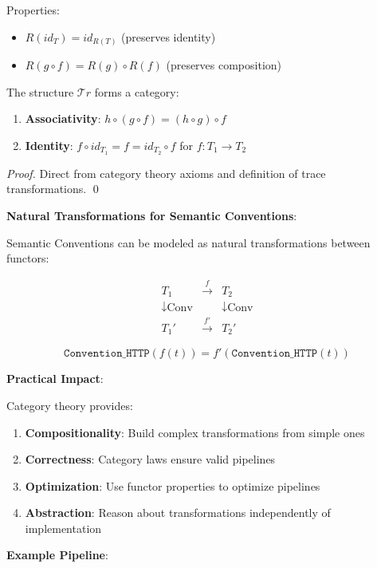 Properties:
\begin{itemize}
\item $R(id_T) = id_{R(T)}$ (preserves identity)
\item $R(g \circ f) = R(g) \circ R(f)$ (preserves composition)
\end{itemize}

\begin{theorem}
\label{thm:category}
The structure $\mathcal{T}r$ forms a category:
\begin{enumerate}
\item \textbf{Associativity}: $h \circ (g \circ f) = (h \circ g) \circ f$
\item \textbf{Identity}: $f \circ id_{T_1} = f = id_{T_2} \circ f$ for $f: T_1 \rightarrow T_2$
\end{enumerate}
\end{theorem}

\begin{proof}
Direct from category theory axioms and definition of trace transformations. \qed
\end{proof}

\textbf{Natural Transformations for Semantic Conventions}:

Semantic Conventions can be modeled as natural transformations between functors:

\[
\begin{array}{ccc}
T_1 & \xrightarrow{f} & T_2 \\
\downarrow \text{Conv} && \downarrow \text{Conv} \\
T_1' & \xrightarrow{f'} & T_2'
\end{array}
\]

\[
\texttt{Convention\_HTTP}(f(t)) = f'(\texttt{Convention\_HTTP}(t))
\]

\textbf{Practical Impact}:

Category theory provides:
\begin{enumerate}
\item \textbf{Compositionality}: Build complex transformations from simple ones
\item \textbf{Correctness}: Category laws ensure valid pipelines
\item \textbf{Optimization}: Use functor properties to optimize pipelines
\item \textbf{Abstraction}: Reason about transformations independently of implementation
\end{enumerate}

\textbf{Example Pipeline}:

